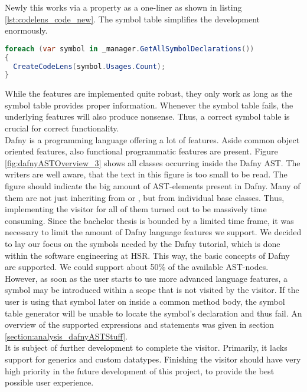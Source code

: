 Newly this works via a property as a one-liner as shown in listing \ref{lst:codelens_code_new}.
The symbol table simplifies the development enormously.

\begin{lstlisting}[language=csharp, caption={Example for CodeLens With the new Symbol Table}, captionpos=b, label={lst:codelens_code_new}]
foreach (var symbol in _manager.GetAllSymbolDeclarations())
{
  CreateCodeLens(symbol.Usages.Count);
}
\end{lstlisting}

While the features are implemented quite robust, they only work as long as the symbol table provides proper information.
Whenever the symbol table fails, the underlying features will also produce nonsense.
Thus, a correct symbol table is crucial for correct functionality.\\

Dafny is a programming language offering a lot of features.
Aside common object oriented features, also functional programmatic features are present.
Figure \ref{fig:dafnyASTOverview_3} shows all classes occurring inside the Dafny AST.
The writers are well aware, that the text in this figure is too small to be read.
The figure should indicate the big amount of AST-elements present in Dafny.
Many of them are not just inheriting from  or , but from individual base classes.
Thus, implementing the visitor for all of them turned out to be massively time consuming.
Since the bachelor thesis is bounded by a limited time frame, it was necessary to limit the amount of Dafny language features we support.
We decided to lay our focus on the symbols needed by the Dafny tutorial, which is done within the software engineering at HSR.
This way, the basic concepts of Dafny are supported.
We could support about 50\% of the available AST-nodes.
However, as soon as the user starts to use more advanced language features, a symbol may be introduced within a scope that is not visited by the visitor.
If the user is using that symbol later on inside a common method body, the symbol table generator will be unable to locate the symbol's declaration and thus fail.
An overview of the supported expressions and statements was given in section \ref{section:analysis_dafnyASTStuff}.\\

It is subject of further development to complete the visitor.
Primarily, it lacks support for generics and custom datatypes.
Finishing the visitor should have very high priority in the future development of this project,
to provide the best possible user experience.

